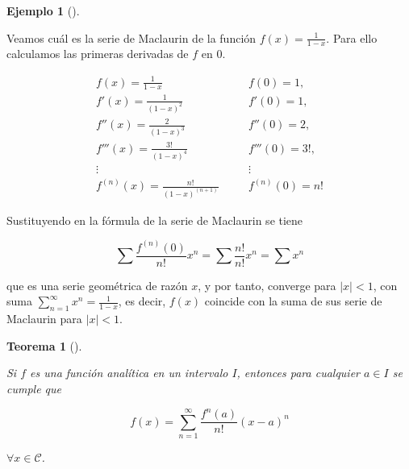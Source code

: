 \documentclass[
  a4paper,
]{scrreport}
\theoremstyle{definition}
\newtheorem{example}{Ejemplo}[chapter]
\theoremstyle{plain}
\theoremstyle{definition}
\theoremstyle{definition}
\theoremstyle{plain}
\newtheorem{theorem}{Teorema}[chapter]
\theoremstyle{plain}
\theoremstyle{remark}
\begin{document}
\begin{example}[]\protect\hypertarget{exm-serie-taylor}{}\label{exm-serie-taylor}

Veamos cuál es la serie de Maclaurin de la función
\(f(x)=\frac{1}{1-x}\). Para ello calculamos las primeras derivadas de
\(f\) en \(0\).

\[
\begin{array}{lll}
f(x)=\frac{1}{1-x} & \quad & f(0)= 1,\\
f'(x)=\frac{1}{(1-x)^2} & & f'(0)=1,\\
f''(x)=\frac{2}{(1-x)^3} & & f''(0)=2,\\
f'''(x)=\frac{3!}{(1-x)^4} & & f'''(0)=3!,\\
\vdots & & \vdots\\
f^{(n)}(x) = \frac{n!}{(1-x)^{(n+1)}} & & f^{(n)}(0) = n!
\end{array}
\]

Sustituyendo en la fórmula de la serie de Maclaurin se tiene

\[
\sum \frac{f^{(n)}(0)}{n!}x^n = \sum \frac{n!}{n!}x^n = \sum x^n
\]

que es una serie geométrica de razón \(x\), y por tanto, converge para
\(|x|<1\), con suma \(\sum_{n=1}^\infty x^n =\frac{1}{1-x}\), es decir,
\(f(x)\) coincide con la suma de sus serie de Maclaurin para \(|x|<1\).

\end{example}

\begin{theorem}[]\protect\hypertarget{thm-serie-taylor}{}\label{thm-serie-taylor}

Si \(f\) es una función analítica en un intervalo \(I\), entonces para
cualquier \(a\in I\) se cumple que

\[
f(x)=\sum_{n=1}^\infty \frac{f^{n}(a)}{n!}(x-a)^n
\]

\(\forall x\in\mathcal{C}\).

\end{theorem}
\end{document}
